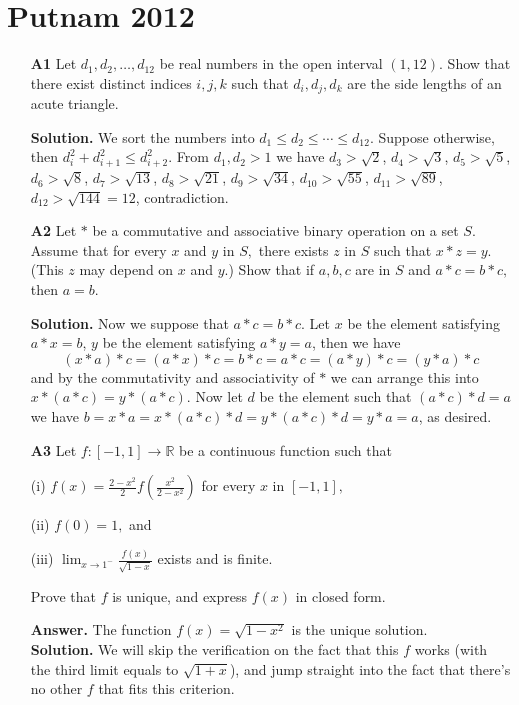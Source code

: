 \documentclass[11pt,a4paper]{article}
\newcommand{\<}{\langle}
\renewcommand{\>}{\rangle}
\begin{document}
\newcommand{\sgn}{\text{sgn}}
\setcounter{secnumdepth}{0}

\section{Putnam 2012}
\begin{enumerate}
	\item [\textbf{A1}]Let $d_1,d_2,\dots,d_{12}$ be real numbers in the open interval $(1,12).$ Show that there exist distinct indices $i,j,k$ such that $d_i,d_j,d_k$ are the side lengths of an acute triangle.
	
	\textbf{Solution.} We sort the numbers into $d_1 \le d_2 \le \cdots \le d_{12}$. Suppose otherwise, then $d_i^2+d_{i+1}^2\le d_{i+2}^2$. From $d_1, d_2 > 1$ we have $d_3>\sqrt{2}$, $d_4 > \sqrt{3}$, $d_5>\sqrt{5}$, $d_6 > \sqrt{8}$, $d_7 > \sqrt{13}$, $d_8 > \sqrt{21}$, $d_9 > \sqrt{34}$, $d_{10} > \sqrt{55}$, $d_{11} > \sqrt{89}$, $d_{12}>\sqrt{144}=12$, contradiction. 
	
	\item[\textbf{A2}] Let $*$ be a commutative and associative binary operation on a set $S.$ Assume that for every $x$ and $y$ in $S,$ there exists $z$ in $S$ such that $x*z=y.$ (This $z$ may depend on $x$ and $y.$) Show that if $a,b,c$ are in $S$ and $a*c=b*c,$ then $a=b.$
	
	\textbf{Solution.} Now we suppose that $a*c=b*c$. Let $x$ be the element satisfying $a*x=b$, $y$ be the element satisfying $a*y=a$, then we have
	\[(x * a) * c = (a * x) * c = b * c = a * c = (a * y) * c= (y * a) * c \]
	and by the commutativity and associativity of $*$ we can arrange this into $x * (a * c) = y * (a * c)$. Now let $d$ be the element such that $(a * c) * d = a$ we have $b = x * a = x * (a * c) * d = y * (a * c) * d = y * a = a$, as desired. 
	
	\item[\textbf{A3}]Let $f:[-1,1]\to\mathbb{R}$ be a continuous function such that
	
	(i) $f(x)=\frac{2-x^2}{2}f\left(\frac{x^2}{2-x^2}\right)$ for every $x$ in $[-1,1],$
	
	(ii) $ f(0)=1,$ and
	
	(iii) $\lim_{x\to 1^-}\frac{f(x)}{\sqrt{1-x}}$ exists and is finite.
	
	Prove that $f$ is unique, and express $f(x)$ in closed form.
	
	\textbf{Answer.} The function $f(x)=\sqrt{1-x^2}$ is the unique solution. \\
	\textbf{Solution.} We will skip the verification on the fact that this $f$ works (with the third limit equals to $\sqrt{1+x}$), and jump straight into the fact that there's no other $f$ that fits this criterion. 
	

\end{enumerate}
\end{document}
